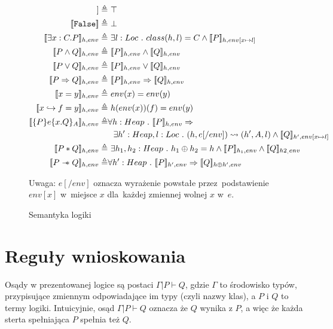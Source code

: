 \documentclass[]{pracamgr}
\newcommand \wand {\mathrel{-\mkern-6mu*}}
\newcommand \hoare [5] {\{#1\}#2\{#4.#5\}_#3}
\renewcommand \| {\hspace{0.75em} | \hspace{0.75em} }
\renewcommand \[ {[\![}
\renewcommand \] {]\!]}
\theoremstyle{definition}
\begin{document}
\begin{figure}
\begin{align*}
 \[ \texttt{True} \] \triangleq & \ \top \\
 \[ \texttt{False} \] \triangleq & \ \bot \\
 \[ \exists x : C . P \]_{h, env} \triangleq & \ \exists l : Loc\ .\ class(h, l) = C \wedge
    \[ P \]_{h, env[x \mapsto l]}  \\
 \[ P \wedge Q \]_{h, env} \triangleq & \ \[ P \]_{h, env} \wedge \[ Q \]_{h, env} \\
 \[ P \vee Q \]_{h, env} \triangleq & \ \[ P \]_{h, env} \vee \[ Q \]_{h, env} \\
 \[ P \Rightarrow Q \]_{h, env} \triangleq & \ \[ P \]_{h, env} \Rightarrow \[ Q \]_{h, env} \\
 \[ x = y \]_{h, env} \triangleq & \ env(x) = env(y) \\
 \[ x \hookrightarrow f = y \]_{h, env} \triangleq & \ h(env(x))(f) = env(y) \\
 \[ \hoare{P}{e}{A}{x}{Q} \]_{h, env} \triangleq & \forall h : Heap \ . \ \[ P \]_{h, env} \Rightarrow \\
      & \ \  \exists h' : Heap, l : Loc \ . \ (h, e[/env]) \leadsto (h', A, l) \wedge
      \[ Q \]_{h', env[x \mapsto l]}  \\
 \[ P * Q \]_{h, env} \triangleq & \ \exists h_1,h_2 : Heap\ .\ h_1 \oplus h_2 = h \wedge
    \[ P \]_{h_1, env} \wedge \[ Q \]_{h2_, env}  \\
 \[ P \wand Q \]_{h, env} \triangleq & \forall h' : Heap \ . \ \[ P \]_{h', env} \Rightarrow \[ Q \]_{h \oplus h', env}
\end{align*}

Uwaga: $e[/env]$ oznacza wyrażenie powstałe przez~podstawienie $env[x]$ w~miejsce $x$ dla~każdej zmiennej
wolnej $x$ w~$e$.

\caption{Semantyka logiki}
\label{fig:sematics}
\end{figure}

\chapter{Reguły wnioskowania}
Osądy w prezentowanej logice są postaci $\Gamma | P \vdash Q$, gdzie $\Gamma$ to środowisko typów,
przypisujące zmiennym odpowiadające im typy (czyli nazwy klas), a $P$ i $Q$ to termy logiki.
Intuicyjnie, osąd $\Gamma | P \vdash Q$ oznacza że $Q$ wynika z $P$, a więc że każda sterta spełniająca
$P$ spełnia też $Q$.
\end{document}
